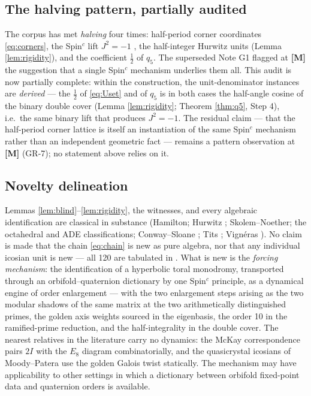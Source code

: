 \documentclass[11pt,a4paper]{article}
\theoremstyle{plain}
\theoremstyle{definition}
\theoremstyle{remark}
\newcounter{witness}
\newcommand{\rtag}[1]{\textnormal{\textbf{[#1]}}}
\begin{document}
\subsection{The halving pattern, partially audited}
The corpus has met \emph{halving} four times: half-period corner coordinates \eqref{eq:corners}, the Spin$^c$ lift $J^2 = -1$ \cite{SpincBridge}, the half-integer Hurwitz units (Lemma \ref{lem:rigidity}), and the coefficient $\tfrac12$ of $q_5$. The superseded Note G1 flagged at \rtag{M} the suggestion that a single Spin$^c$ mechanism underlies them all. This audit is now partially complete: within the construction, the unit-denominator instances are \emph{derived} --- the $\tfrac12$ of \eqref{eq:Uset} and of $q_5$ is in both cases the half-angle cosine of the binary double cover (Lemma \ref{lem:rigidity}; Theorem \ref{thm:q5}, Step 4), i.e.\ the same binary lift that produces $J^2 = -1$. The residual claim --- that the half-period corner lattice is itself an instantiation of the same Spin$^c$ mechanism rather than an independent geometric fact --- remains a pattern observation at \rtag{M} (GR-7); no statement above relies on it.

\subsection{Novelty delineation}
Lemmas \ref{lem:blind}--\ref{lem:rigidity}, the witnesses, and every algebraic identification are classical in substance (Hamilton; Hurwitz \cite{Hurwitz}; Skolem--Noether; the octahedral and ADE classifications; Conway--Sloane \cite{ConwaySloane}; Tits \cite{Tits}; Vign\'eras \cite{Vigneras}). No claim is made that the chain \eqref{eq:chain} is new as pure algebra, nor that any individual icosian unit is new --- all 120 are tabulated in \cite{ConwaySloane}. What is new is the \emph{forcing mechanism}: the identification of a hyperbolic toral monodromy, transported through an orbifold--quaternion dictionary by one Spin$^c$ principle, as a dynamical engine of order enlargement --- with the two enlargement steps arising as the two modular shadows of the same matrix at the two arithmetically distinguished primes, the golden axis weights sourced in the eigenbasis, the order 10 in the ramified-prime reduction, and the half-integrality in the double cover. The nearest relatives in the literature carry no dynamics: the McKay correspondence \cite{McKay} pairs $2I$ with the $E_8$ diagram combinatorially, and the quasicrystal icosians of Moody--Patera \cite{MoodyPatera} use the golden Galois twist statically. The mechanism may have applicability to other settings in which a dictionary between orbifold fixed-point data and quaternion orders is available.
\end{document}
